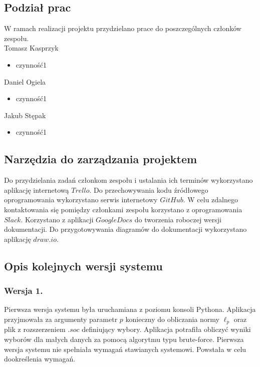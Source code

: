 \documentclass[polish,11pt]{aghthesis}
\begin{document}
\subsection{Podział prac}
W ramach realizacji projektu przydzielano prace do poszczególnych członków zespołu.
\vspace{\baselineskip} \\
Tomasz Kasprzyk
\begin{itemize}
\item czynność1
\end{itemize}
Daniel Ogiela
\begin{itemize}
\item czynność1
\end{itemize}
Jakub Stępak
\begin{itemize}
\item czynność1
\end{itemize}

\subsection{Narzędzia do zarządzania projektem}
Do przydzielania zadań członkom zespołu i ustalania ich terminów wykorzystano aplikację
internetową $Trello$. Do przechowywania kodu źródłowego oprogramowania wykorzystano
serwis internetowy $GitHub$. W celu zdalnego kontaktowania się pomiędzy członkami zespołu
korzystano z oprogramowania $Slack$. Korzystano z aplikacji $Google Docs$ do tworzenia
roboczej wersji dokumentacji. Do przygotowywania diagramów do dokumentacji
wykorzystano aplikację $draw.io$.

\subsection{Opis kolejnych wersji systemu}
\subsubsection{Wersja 1.}
Pierwsza wersja systemu była uruchamiana z poziomu konsoli Pythona. Aplikacja
przyjmowała za argumenty parametr $p$ konieczny do obliczania normy $\ell_p$ oraz plik z
rozszerzeniem $.soc$ definiujący wybory. Aplikacja potrafiła obliczyć wyniki wyborów dla
małych danych za pomocą algorytmu typu brute-force. Pierwsza wersja systemu nie spełniała wymagań stawianych systemowi. Powstała w celu dookreślenia wymagań.
\end{document}
